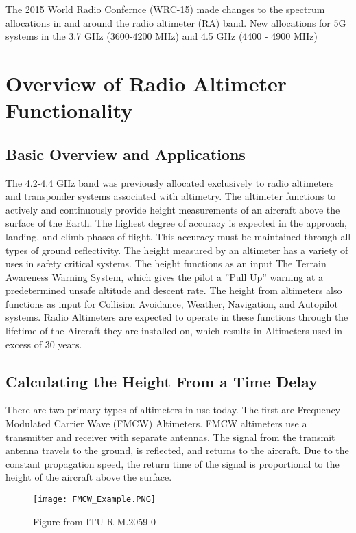 The 2015 World Radio Confernce (WRC-15) made changes to the spectrum allocations in and around the radio altimeter (RA) band. New allocations for 5G systems in the 3.7 GHz (3600-4200 MHz) and 4.5 GHz (4400 - 4900 MHz)

\section{Overview of Radio Altimeter Functionality}

\subsection{Basic Overview and Applications}
The 4.2-4.4 GHz band was previously allocated exclusively to radio altimeters and transponder systems associated with altimetry. The altimeter functions to actively and continuously provide height measurements of an aircraft above the surface of the Earth. The highest degree of accuracy is expected in the approach, landing, and climb phases of flight. This accuracy must be maintained through all types of ground reflectivity. The height measured by an altimeter has a variety of uses in safety critical systems. The height functions as an input The Terrain Awareness Warning System, which gives the pilot a  ''Pull Up'' warning at a predetermined unsafe altitude and descent rate. The height from altimeters also functions as input for Collision Avoidance, Weather, Navigation, and Autopilot systems. Radio Altimeters are expected to operate in these functions through the lifetime of the Aircraft they are installed on, which results in Altimeters used in excess of 30 years.

\subsection{Calculating the Height From a Time Delay}
There are two primary types of altimeters in use today. The first are Frequency Modulated Carrier Wave (FMCW) Altimeters. FMCW altimeters use a transmitter and receiver with separate antennas. The signal from the transmit antenna travels to the ground, is reflected, and returns to the aircraft. Due to the constant propagation speed, the return time of the signal is proportional to the height of the aircraft above the surface. 
\begin{figure}
 \centering
 \texttt{[image: FMCW\_Example.PNG]}
 \caption{Figure from ITU-R M.2059-0}
 \label{fig:FMCW}
\end{figure}

